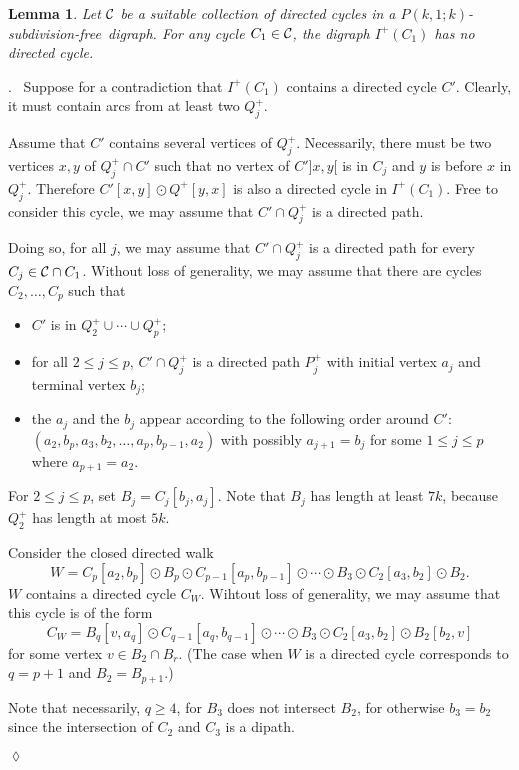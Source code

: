 \documentclass[utf8,10pt]{article}
\theoremstyle{plain}
\newtheorem{lemma}[theorem]{Lemma}
\theoremstyle{definition}
\theoremstyle{remark}
\newenvironment{subproof}{\par\noindent {\it Subproof}.\ }{\hfill$\lozenge$\par\vspace{11pt}}
\newcommand{\free}{subdivision-free}
\begin{document}
\begin{lemma}\label{lem:no-dicycle}
Let ${\cal C}$ be a suitable collection of directed cycles in a $P(k,1;k)$-\free\ digraph. For any cycle $C_1\in {\cal C}$, the digraph
$I^+(C_1)$ has no directed cycle.  
\end{lemma}
\begin{subproof}
Suppose for a contradiction that $I^+(C_1)$  contains a directed cycle $C'$.
Clearly, it must contain arcs from at least two $Q^+_j$.



Assume that $C'$ contains several vertices of $Q^+_j$.
Necessarily, there must be two vertices $x,y$ of $Q^+_j\cap C'$ such that no vertex of $C']x,y[$ is in $C_j$ and  $y$ is before $x$ in $Q^+_j$.
Therefore $C'[x,y]\odot Q^+[y,x]$ is also a directed cycle in $I^+(C_1)$. Free to consider this cycle,
we may assume that $C'\cap Q^+_j$ is a directed path.

Doing so, for all $j$, we may assume that $C'\cap Q^+_j$ is a directed path  for every $C_j\in {\cal C}\cap C_1$.
Without loss of generality, we may assume that there are cycles $C_2, \dots , C_p$ such that
\begin{itemize}
\item $C'$ is in $Q^+_2\cup \cdots  \cup Q^+_p$;
\item for all $2\leq j\leq p$, $C'\cap Q^+_j$ is a directed path $P^+_j$ with initial vertex $a_j$ and terminal vertex $b_j$;
\item the $a_j$ and the $b_j$ appear according to the following order around $C'$: $(a_2, b_p, a_3, b_2, \dots ,   a_p, b_{p-1}, a_2)$ with possibly $a_{j+1}=b_j$ for some $1\leq j \leq p$ where $a_{p+1}=a_2$.
\end{itemize}
For $2\leq j\leq p$, set $B_j=C_j[b_j, a_j]$. Note that $B_j$ has length at least $7k$, because $Q^+_2$ has length at most $5k$.


Consider the closed directed walk $$W=C_p[a_2,b_p]\odot B_p \odot C_{p-1}[a_p, b_{p-1}] \odot  \cdots  \odot  B_3\odot C_2[a_3, b_2]\odot B_2.$$
$W$ contains a directed cycle $C_W$. Wihtout loss of generality, we may assume that this cycle is of the form
$$C_W=B_q[v, a_q] \odot C_{q-1}[a_q, b_{q-1}] \odot  \cdots  \odot  B_3\odot C_2[a_3, b_2]\odot B_2[b_2, v]$$
for some vertex $v\in B_2\cap B_r$. (The case when $W$ is a directed cycle corresponds to $q=p+1$ and $B_2=B_{p+1}$.)

Note that necessarily, $q\geq 4$, for $B_3$ does not intersect $B_2$, for otherwise $b_3=b_2$ since the intersection of $C_2$ and $C_3$ is a dipath.


\end{subproof}
\end{document}
